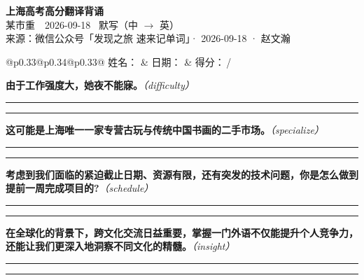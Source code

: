 \documentclass[11pt,a4paper]{article}
\newcommand{\num}[1]{\makebox[1.9em][r]{#1.}\hspace{0.3em}}
\newcommand{\wline}{\noindent\rule{\linewidth}{0.4pt}}
\newcommand{\prompt}[1]{\emph{\textcolor{tipblue}{\small（#1）}}}
\begin{document}
\pagestyle{plain}
\begin{center}
{\LARGE\bfseries 上海高考高分翻译背诵 }\\[0.25em]
{\large 某市重　2026-09-18 \quad\ 默写（中 $\to$ 英）}\\[0.35em]
{\footnotesize 来源：微信公众号「发现之旅 速来记单词」· 2026-09-18 · 赵文瀚}
\end{center}

\vspace{0.4em}
\noindent\begin{tabular}{@{}p{0.33\textwidth}@{}p{0.34\textwidth}@{}p{0.33\textwidth}@{}}
姓名：\underline{\hspace{2.0cm}} & 日期：\underline{\hspace{2.0cm}} & 得分：\underline{\hspace{1.4cm}}\,/ \\
\end{tabular}

\vspace{0.5em}

\vspace{0.8em}
\num{1}\textbf{由于工作强度大，她夜不能寐。}\prompt{difficulty}

\vspace{0.3em}

\wline\vspace{0.3em}
\wline

\num{2}\textbf{这可能是上海唯一一家专营古玩与传统中国书画的二手市场。}\prompt{specialize}

\vspace{0.3em}

\wline\vspace{0.3em}
\wline

\num{3}\textbf{考虑到我们面临的紧迫截止日期、资源有限，还有突发的技术问题，你是怎么做到提前一周完成项目的?}\prompt{schedule}

\vspace{0.3em}

\wline\vspace{0.3em}
\wline

\num{4}\textbf{在全球化的背景下，跨文化交流日益重要，掌握一门外语不仅能提升个人竞争力，还能让我们更深入地洞察不同文化的精髓。}\prompt{insight}

\vspace{0.3em}

\wline\vspace{0.3em}
\wline
\end{document}
